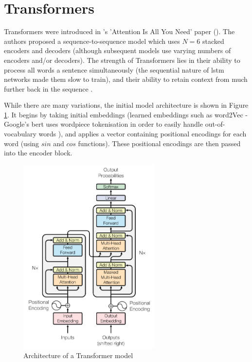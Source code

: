 \section{Transformers}
\label{sec:background_transformers}
Transformers were introduced in \citeauthor{vaswani2017attention}'s 'Attention Is All You Need' paper (\citeyear{vaswani2017attention}). The authors proposed a sequence-to-sequence model which uses $N=6$ stacked encoders and decoders (although subsequent models use varying numbers of encoders and/or decoders). The strength of Transformers lies in their ability to process all words a sentence simultaneously (the sequential nature of \acrshort{lstm} networks made them slow to train), and their ability to retain context from much further back in the sequence \cite{vaswani2017attention}. 

While there are many variations, the initial model architecture is shown in Figure \ref{fig:transformer_architecture}. It begins by taking initial embeddings (learned embeddings such as word2Vec - Google's \acrshort{bert} uses wordpiece tokenisation in order to easily handle out-of-vocabulary words \citep{wu2016googles}), and applies a vector containing positional encodings for each word (using $sin$ and $cos$ functions). These positional encodings are then passed into the encoder block.

\begin{figure}[h]
    \centering
    \includegraphics[height=10cm,trim={0 0 0cm 0cm},clip]{paper/images/transformer.png}
    \caption{Architecture of a Transformer model \citep{vaswani2017attention}}
    \label{fig:transformer_architecture}
\end{figure}

